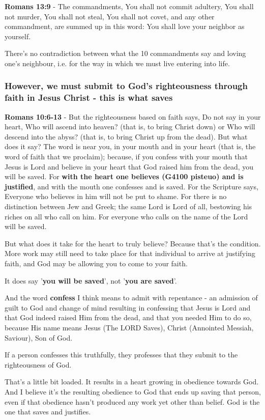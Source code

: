 \documentclass[11pt]{article}
\begin{document}
\textbf{Romans 13:9} - The commandments, You shall not commit adultery, You shall not murder, You shall not steal, You shall not covet, and any other commandment, are summed up in this word: You shall love your neighbor as yourself.

There's no contradiction between what the 10 commandments say and loving one's neighbour, i.e. for the way in which we must live entering into life.

\subsubsection{However, we must submit to God's righteousness through faith in Jesus Christ - this is what saves}
\label{sec:org6ce2b99}
\textbf{Romans 10:6-13} - But the righteousness based on faith says, Do not say in your heart, Who will ascend into heaven? (that is, to bring Christ down) or Who will descend into the abyss? (that is, to bring Christ up from the dead).  But what does it say? The word is near you, in your mouth and in your heart (that is, the word of faith that we proclaim); because, if you confess with your mouth that Jesus is Lord and believe in your heart that God raised him from the dead, you will be saved.  For \textbf{with the heart one believes (G4100 pisteuo) and is justified}, and with the mouth one confesses and is saved.  For the Scripture says, Everyone who believes in him will not be put to shame.  For there is no distinction between Jew and Greek; the same Lord is Lord of all, bestowing his riches on all who call on him.  For everyone who calls on the name of the Lord will be saved.

But what does it take for the heart to truly believe? Because that's the condition.
More work may still need to take place for that individual to arrive at justifying faith, and God may be allowing you to come to your faith.

It does say '\textbf{you will be saved}', not '\textbf{you are saved}'.

And the word \textbf{confess} I think means to admit with repentance - an admission of guilt to God and change of mind resulting in confessing that Jesus is Lord and that God indeed raised Him from the dead, and that you needed Him to do so, because His name means Jesus (The LORD Saves), Christ (Annointed Messiah, Saviour), Son of God.

If a person confesses this truthfully, they professes that they submit to the righteousness of God.

That's a little bit loaded. It results in a heart growing in obedience towards God.
And I believe it's the resulting obedience to God that ends up saving that person, even if that obedience hasn't produced any work yet other than belief. God is the one that saves and justifies.
\end{document}
